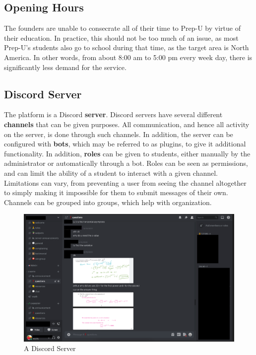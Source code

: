 \documentclass{business}
\begin{document}
    \subsection{Opening Hours}
    The founders are unable to consecrate all of their time to Prep-U by virtue of their education. In practice, this should not be too much of an issue, as most Prep-U’s students also go to school during that time, as the target area is North America. In other words, from about 8:00 am to 5:00 pm every week day, there is significantly less demand for the service.
    \subsection{Discord Server}
    The platform is a Discord \textbf{server}. Discord servers have several different \textbf{channels} that can be given purposes. All communication, and hence all activity on the server, is done through such channels. In addition, the server can be configured with \textbf{bots}, which may be referred to as plugins, to give it additional functionality. In addition, \textbf{roles} can be given to students, either manually by the administrator or automatically through a bot. Roles can be seen as permissions, and can limit the ability of a student to interact with a given channel. Limitations can vary, from preventing a user from seeing the channel altogether to simply making it impossible for them to submit messages of their own. Channels can be grouped into groups, which help with organization.
    \begin{figure}
        \centering
        \caption{A Discord Server}
        \includegraphics[scale=0.5]{images/general-server-redacted.png}
    \end{figure} 
\end{document}
